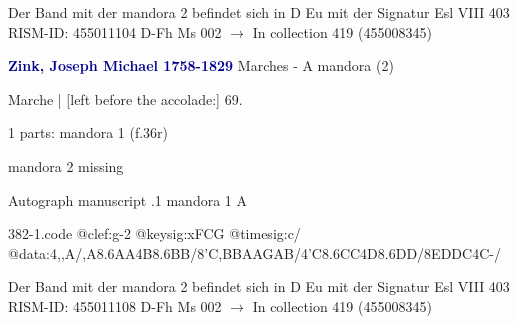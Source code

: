 \documentclass[twocolumn]{book}
\begin{document}
\newline Der Band mit der mandora 2 befindet sich in D Eu mit der Signatur Esl VIII 403
\newline RISM-ID: 455011104
\newline D-Fh  Ms 002
\newline $\rightarrow$ In collection 419 (455008345)
      
\newline \par \vspace{7pt} \textcolor{darkblue}{\textbf{Zink, Joseph Michael  1758-1829}}
\newline Marches - A
\newline mandora (2)
\newline \begin{itshape}[f.36r, at left:] Marche | [left before the accolade:] 69.\end{itshape} 
\newline \textcolor{darkblue}{}  1 parts: mandora 1  (f.36r)
\newline \begin{small} mandora 2 missing\end{small} 
\newline Autograph manuscript
.1  mandora 1  A  
\begin{filecontents*}{382-1.code}
@clef:g-2
@keysig:xFCG
@timesig:c/
@data:4,,A/,A{8.6AA}4B{8.6BB}/8'C,BBAAGAB/4'C{8.6CC}4D{8.6DD}/8EDDC4C-/
\end{filecontents*}
\newline
%

\newline Der Band mit der mandora 2 befindet sich in D Eu mit der Signatur Esl VIII 403
\newline RISM-ID: 455011108
\newline D-Fh  Ms 002
\newline $\rightarrow$ In collection 419 (455008345)
      
\end{document}
